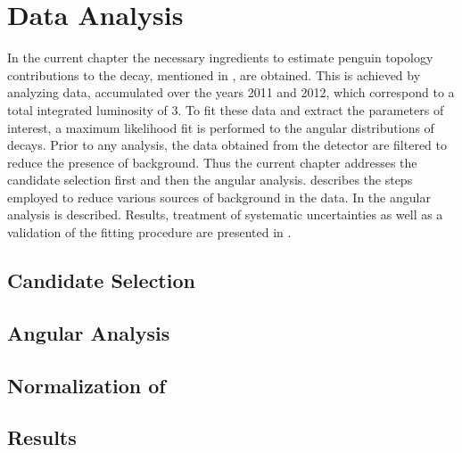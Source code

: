 \chapter{Data Analysis}
\label{Data_Analysis}

In the current chapter the necessary ingredients to estimate penguin topology contributions to the \BsJpsiPhi decay,
mentioned in , are obtained. This is achieved by analyzing \runone \lhcb data,
accumulated over the years 2011 and 2012, which correspond to a total integrated luminosity of 3\invfb.
To fit these data and extract the parameters of interest, a maximum likelihood fit is performed to the angular
distributions of \BsJpsiKst decays. Prior to any analysis, the data obtained from the detector are filtered
to reduce the presence of background. Thus the current chapter addresses the \Bs candidate selection first and
then the angular analysis.  describes the steps employed to reduce various sources of
background in the data. In  the angular analysis is described. Results, treatment of
systematic uncertainties as well as a validation of the fitting procedure are presented in .

\section{Candidate Selection}
\label{Event_Selection}


\section{Angular Analysis}
\label{Angular_Analysis}


\section{Normalization of \BsJpsiKpi}
\label{Normalization}


\section{Results}
\label{Results}

